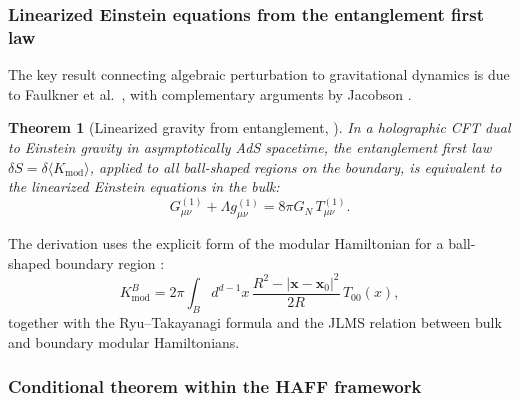 \documentclass[12pt,a4paper,openany]{book}
\newtheorem{theorem}{Theorem}[chapter]
\begin{document}
\subsubsection{Linearized Einstein equations from the entanglement first law}

The key result connecting algebraic perturbation to gravitational dynamics is due to Faulkner et al.\ \cite{Faulkner2014}, with complementary arguments by Jacobson \cite{Jacobson2016}.

\begin{theorem}[Linearized gravity from entanglement, {\cite{Faulkner2014}}]
\label{H-D-thm:linearized-Faulkner}
In a holographic CFT dual to Einstein gravity in asymptotically AdS spacetime, the entanglement first law $\delta S = \delta\langle K_{\mathrm{mod}}\rangle$, applied to all ball-shaped regions on the boundary, is equivalent to the linearized Einstein equations in the bulk:
\begin{equation}
G_{\mu\nu}^{(1)} + \Lambda g_{\mu\nu}^{(1)} = 8\pi G_N\, T_{\mu\nu}^{(1)}.
\end{equation}
\end{theorem}

The derivation uses the explicit form of the modular Hamiltonian for a ball-shaped boundary region \cite{CasiniHuertaMyers2011}:
\begin{equation}
K_{\mathrm{mod}}^B = 2\pi \int_B d^{d-1}x\, \frac{R^2 - |\mathbf{x} - \mathbf{x}_0|^2}{2R}\, T_{00}(x),
\end{equation}
together with the Ryu--Takayanagi formula and the JLMS relation \cite{JLMS2016} between bulk and boundary modular Hamiltonians.

\subsubsection{Conditional theorem within the HAFF framework}
\end{document}
